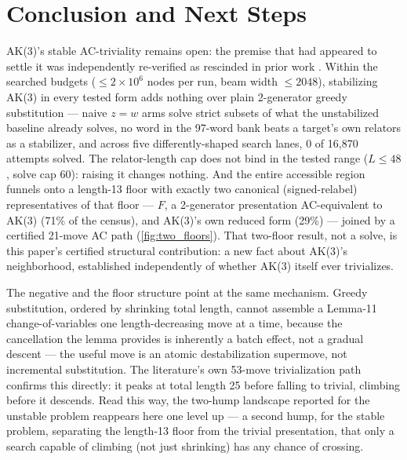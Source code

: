 \section{Conclusion and Next Steps}\label{sec:conclusion}

AK(3)'s stable AC-triviality remains open: the premise that had appeared to settle it was
independently re-verified as rescinded in prior work \cite{shehper2024hard}. Within the
searched budgets ($\leq 2\times10^6$ nodes per run, beam width $\leq 2048$), stabilizing AK(3)
in every tested form adds nothing over plain 2-generator greedy substitution --- naive $z=w$
arms solve strict subsets of what the unstabilized baseline already solves, no word in the
97-word bank beats a target's own relators as a stabilizer, and across five
differently-shaped search lanes, 0 of 16,870 attempts solved. The relator-length cap does
not bind in the tested range ($L\leq48$, solve cap 60): raising it changes nothing. And the
entire accessible region funnels onto a length-13 floor with exactly two canonical
(signed-relabel) representatives of that floor --- $F$, a 2-generator presentation
AC-equivalent to AK(3) (71\% of the census), and AK(3)'s own reduced form (29\%) --- joined by
a certified 21-move AC path (\ref{fig:two_floors}). That two-floor result, not a solve, is
this paper's certified structural contribution: a new fact about AK(3)'s neighborhood,
established independently of whether AK(3) itself ever trivializes.

The negative and the floor structure point at the same mechanism. Greedy substitution,
ordered by shrinking total length, cannot assemble a Lemma-11 change-of-variables one
length-decreasing move at a time, because the cancellation the lemma provides is inherently
a batch effect, not a gradual descent --- the useful move is an atomic destabilization
supermove, not incremental substitution. The literature's own 53-move trivialization path
confirms this directly: it peaks at total length 25 before falling to trivial, climbing
before it descends. Read this way, the two-hump landscape reported for the unstable problem
\cite{fagan2026twohump} reappears here one level up --- a second hump, for the stable problem,
separating the length-13 floor from the trivial presentation, that only a search capable of
climbing (not just shrinking) has any chance of crossing.

